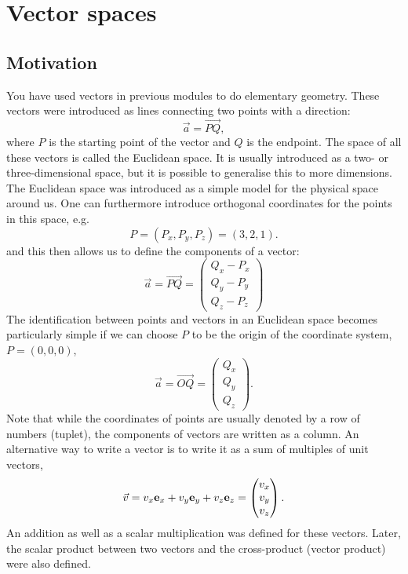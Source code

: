 \documentclass[
  a4paper,
  DIV=11,
  numbers=noendperiod,
  oneside]{scrreprt}
\theoremstyle{definition}
\theoremstyle{remark}
\begin{document}
\chapter{Vector spaces}\label{vector-spaces}

\section{Motivation}\label{motivation}

You have used vectors in previous modules to do elementary geometry.
These vectors were introduced as lines connecting two points with a
direction: \[{\vec a} = \overrightarrow{PQ},\] where \(P\) is the
starting point of the vector and \(Q\) is the endpoint. The space of all
these vectors is called the Euclidean space. It is usually introduced as
a two- or three-dimensional space, but it is possible to generalise this
to more dimensions. The Euclidean space was introduced as a simple model
for the physical space around us. One can furthermore introduce
orthogonal coordinates for the points in this space, e.g.
\[P =  (P_x,P_y,P_z) = (3,2,1).\] and this then allows us to define the
components of a vector:
\[{\vec a} = \overrightarrow{PQ} =  \begin{pmatrix}    Q_x- P_x \\ Q_y- P_y \\ Q_z -P_z  \end{pmatrix} \]
The identification between points and vectors in an Euclidean space
becomes particularly simple if we can choose \(P\) to be the origin of
the coordinate system, \(P=(0,0,0)\),
\[{\vec a} = \overrightarrow{OQ} =   \begin{pmatrix}    Q_x \\ Q_y \\ Q_z  \end{pmatrix} .\]
Note that while the coordinates of points are usually denoted by a row
of numbers (tuplet), the components of vectors are written as a column.
An alternative way to write a vector is to write it as a sum of
multiples of unit vectors,
\[{\vec v} =   v_x {\bf e}_x + v_y {\bf e}_y + v_z {\bf e}_z  =  \begin{pmatrix}    v_x \\ v_y \\ v_z  \end{pmatrix}.\]
An addition as well as a scalar multiplication was defined for these
vectors. Later, the scalar product between two vectors and the
cross-product (vector product) were also defined.
\end{document}
